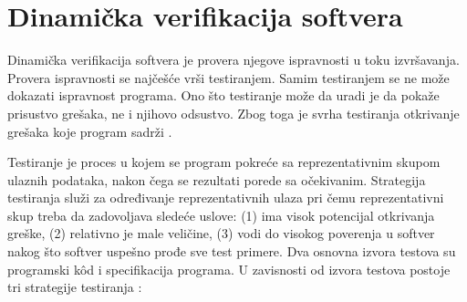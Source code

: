 \documentclass[12pt,oneside]{memoir}
\begin{document}
\section{Dinamička verifikacija softvera}
Dinamička verifikacija softvera je provera njegove ispravnosti u toku izvršavanja. Provera ispravnosti se najčešće vrši testiranjem. Samim testiranjem se ne može dokazati ispravnost programa. Ono što testiranje može da uradi je da pokaže prisustvo grešaka, ne i njihovo odsustvo. Zbog toga je svrha testiranja otkrivanje grešaka koje program sadrži \cite{mvj}.  

Testiranje je proces u kojem se program pokreće sa reprezentativnim skupom ulaznih podataka, nakon čega se rezultati porede sa očekivanim. Strategija testiranja služi za određivanje reprezentativnih ulaza pri čemu reprezentativni skup treba da zadovoljava sledeće uslove: (1) ima visok potencijal otkrivanja greške, (2) relativno je male veličine, (3) vodi do visokog poverenja u softver nakog što softver uspešno prođe sve test primere. Dva osnovna izvora testova su programski k\^od i specifikacija programa. U zavisnosti od izvora testova postoje tri strategije testiranja \cite{mvj}:
\end{document}
